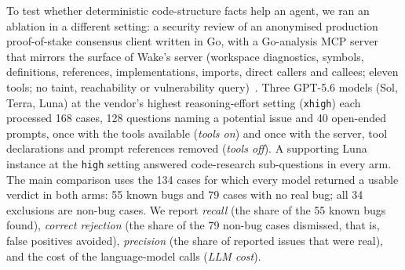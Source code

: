 \documentclass[11pt,a4paper]{article}
\newcommand{\wake}{Wake}
\begin{document}
To test whether deterministic code-structure facts help an agent, we ran an ablation in a different setting: a security review of an anonymised production proof-of-stake consensus client written in Go, with a Go-analysis MCP server that mirrors the surface of \wake{}'s server (workspace diagnostics, symbols, definitions, references, implementations, imports, direct callers and callees; eleven tools; no taint, reachability or vulnerability query)~\cite{prevratil2026ablation}. Three GPT-5.6 models (Sol, Terra, Luna) at the vendor's highest reasoning-effort setting (\texttt{xhigh}) each processed 168 cases, 128 questions naming a potential issue and 40 open-ended prompts, once with the tools available (\emph{tools on}) and once with the server, tool declarations and prompt references removed (\emph{tools off}). A supporting Luna instance at the \texttt{high} setting answered code-research sub-questions in every arm. The main comparison uses the 134 cases for which every model returned a usable verdict in both arms: 55 known bugs and 79 cases with no real bug; all 34 exclusions are non-bug cases. We report \emph{recall} (the share of the 55 known bugs found), \emph{correct rejection} (the share of the 79 non-bug cases dismissed, that is, false positives avoided), \emph{precision} (the share of reported issues that were real), and the cost of the language-model calls (\emph{LLM cost}).
\end{document}
